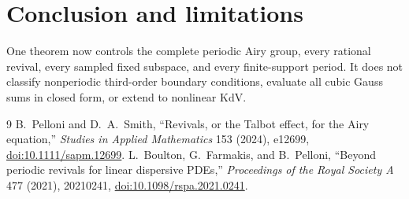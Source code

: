 \documentclass[10pt]{article}
\begin{document}
\section{Conclusion and limitations}
One theorem now controls the complete periodic Airy group, every rational
revival, every sampled fixed subspace, and every finite-support period.  It
does not classify nonperiodic third-order boundary conditions, evaluate all
cubic Gauss sums in closed form, or extend to nonlinear KdV.

\begin{thebibliography}{9}
 B.~Pelloni and D.~A.~Smith, ``Revivals, or the Talbot
effect, for the Airy equation,'' \emph{Studies in Applied Mathematics} 153
(2024), e12699,
\href{https://doi.org/10.1111/sapm.12699}{doi:10.1111/sapm.12699}.
 L.~Boulton, G.~Farmakis, and B.~Pelloni, ``Beyond
periodic revivals for linear dispersive PDEs,'' \emph{Proceedings of the
Royal Society A} 477 (2021), 20210241,
\href{https://doi.org/10.1098/rspa.2021.0241}{doi:10.1098/rspa.2021.0241}.
\end{thebibliography}
\end{document}
